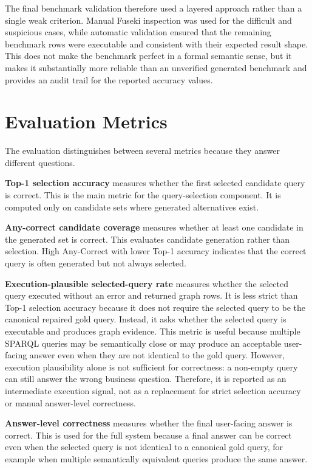 \documentclass[
  12pt,
  english,
  oneside]{report}
\begin{document}
The final benchmark validation therefore used a layered approach rather than a single weak criterion. Manual Fuseki inspection was used for the difficult and suspicious cases, while automatic validation ensured that the remaining benchmark rows were executable and consistent with their expected result shape. This does not make the benchmark perfect in a formal semantic sense, but it makes it substantially more reliable than an unverified generated benchmark and provides an audit trail for the reported accuracy values.

\section{Evaluation Metrics}
\label{sec:evaluation-metrics}

The evaluation distinguishes between several metrics because they answer different questions.

\textbf{Top-1 selection accuracy} measures whether the first selected candidate query is correct. This is the main metric for the query-selection component. It is computed only on candidate sets where generated alternatives exist.

\textbf{Any-correct candidate coverage} measures whether at least one candidate in the generated set is correct. This evaluates candidate generation rather than selection. High Any-Correct with lower Top-1 accuracy indicates that the correct query is often generated but not always selected.

\textbf{Execution-plausible selected-query rate} measures whether the selected query executed without an error and returned graph rows. It is less strict than Top-1 selection accuracy because it does not require the selected query to be the canonical repaired gold query. Instead, it asks whether the selected query is executable and produces graph evidence. This metric is useful because multiple SPARQL queries may be semantically close or may produce an acceptable user-facing answer even when they are not identical to the gold query. However, execution plausibility alone is not sufficient for correctness: a non-empty query can still answer the wrong business question. Therefore, it is reported as an intermediate execution signal, not as a replacement for strict selection accuracy or manual answer-level correctness.

\textbf{Answer-level correctness} measures whether the final user-facing answer is correct. This is used for the full system because a final answer can be correct even when the selected query is not identical to a canonical gold query, for example when multiple semantically equivalent queries produce the same answer.
\end{document}
